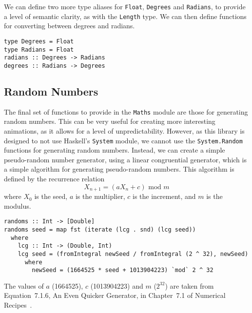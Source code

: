 \documentclass[../main.tex]{subfiles}
\begin{document}
            We can define two more type aliases for \verb|Float|, \verb|Degrees| and
                \verb|Radians|, to provide a level of semantic clarity, as with the
                \verb|Length| type.
            We can then define functions for converting between degrees and radians.

            \begin{lstlisting}[label={lst:angleFns}, caption={The angle functions.}]  
type Degrees = Float
type Radians = Float                
radians :: Degrees -> Radians
degrees :: Radians -> Degrees\end{lstlisting}

        \subsection{Random Numbers}
            The final set of functions to provide in the \verb|Maths| module are those for
                generating random numbers.
            This can be very useful for creating more interesting animations, as it allows
                for a level of unpredictability.
            However, as this library is designed to not use Haskell's \verb|System| module,
                we cannot use the \verb|System.Random| functions for generating random numbers.
            Instead, we can create a simple pseudo-random number generator, using a linear
                congruential generator, which is a simple algorithm for generating
                pseudo-random numbers.
            This algorithm is defined by the recurrence relation $$X_{n+1} = (aX_n + c)
                    \text{ mod } m$$ where $X_0$ is the seed, $a$ is the multiplier, $c$ is the
                increment, and $m$ is the modulus.

            \begin{lstlisting}[label={lst:random}, caption={The random number
                generator, which uses a linear congruential generator to generate an infinite
                list of pseudo-random numbers, mapped to the range [0, 1].}]
randoms :: Int -> [Double]
randoms seed = map fst (iterate (lcg . snd) (lcg seed))
  where
    lcg :: Int -> (Double, Int)
    lcg seed = (fromIntegral newSeed / fromIntegral (2 ^ 32), newSeed)
      where
        newSeed = (1664525 * seed + 1013904223) `mod` 2 ^ 32\end{lstlisting}

            The values of $a$ (1664525), $c$ (1013904223) and $m$ ($2^32$) are taken from
                Equation~7.1.6, An Even Quicker Generator, in Chapter~7.1 of Numerical
                Recipes~\citep{numericalRecipes}.
\end{document}
